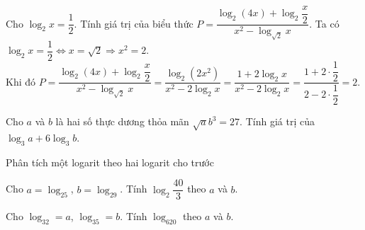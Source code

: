 \begin{vd}
	Cho $\log_2x = \dfrac{1}{2}$. Tính giá trị của biểu thức $P = \dfrac{\log_2{(4x)} + \log_2 \dfrac{x}{2}}{x^2 - \log_{\sqrt{2}}x}$.
	\loigiai
	{
		Ta có $\log_2x = \dfrac{1}{2} \Leftrightarrow x = \sqrt{2} \Rightarrow x^2 = 2$. \\ Khi đó
		$P=\dfrac{\log_2(4x)+\log_2\dfrac{x}{2}}{x^2-\log_{\sqrt{2}}x}=\dfrac{\log_2\left(2x^2\right)}{x^2-2\log_2x}=\dfrac{1+2\log_2x}{x^2-2\log_2x}=\dfrac{1+2\cdot \dfrac{1}{2}}{2-2\cdot \dfrac{1}{2}}=2.$
	}
\end{vd} 

\begin{vd}
	Cho $a$ và $b$ là hai số thực dương thỏa mãn $\sqrt{a}b^3=27$. Tính giá trị của $\log_3a+6\log_3b$.
\end{vd} 

\begin{dang}{Phân tích một logarit theo hai logarit cho trước}
\end{dang}

\begin{vd}
	Cho $a=\log_25$, $b=\log_29$. Tính $\log_2\dfrac{40}{3}$ theo $a$ và $b$.
\end{vd} 

\begin{vd}
	Cho $\log_32=a$, $\log_35=b$. Tính $\log_620$ theo $a$ và $b$.
\end{vd} 


